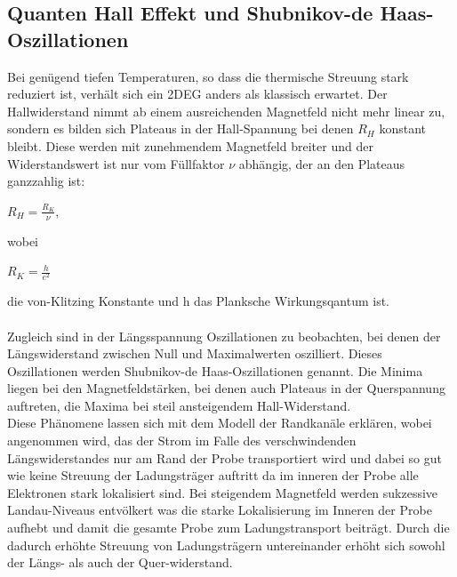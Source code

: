 \documentclass[10pt,a4paper]{article}
\begin{document}
\subsection*{Quanten Hall Effekt und Shubnikov-de Haas-Oszillationen}
Bei genügend tiefen Temperaturen, so dass die thermische Streuung stark reduziert ist, verhält sich ein 2DEG anders als klassisch erwartet. Der Hallwiderstand nimmt ab einem ausreichenden Magnetfeld nicht mehr linear zu, sondern es bilden sich Plateaus in der Hall-Spannung bei denen $ R_H $ konstant bleibt. Diese werden mit zunehmendem Magnetfeld breiter und der Widerstandswert ist nur vom Füllfaktor $ \nu $ abhängig, der an den Plateaus ganzzahlig ist: 
\begin{center}
 $ R_H =\frac{R_K}{\nu}$,
 \end{center} 
 wobei
 \begin{center}
  $R_K=\frac{h}{e^2} $
\end{center} 
die von-Klitzing Konstante und h das Planksche Wirkungsqantum ist.\\ \\
Zugleich sind in der Längsspannung Oszillationen zu beobachten, bei denen der Längswiderstand zwischen Null und Maximalwerten oszilliert. Dieses Oszillationen werden  Shubnikov-de Haas-Oszillationen genannt. Die Minima liegen bei den Magnetfeldstärken, bei denen auch Plateaus in der Querspannung auftreten, die Maxima bei steil ansteigendem Hall-Widerstand.\\
Diese Phänomene lassen sich mit dem Modell der Randkanäle erklären, wobei angenommen wird, das der Strom im Falle des verschwindenden Längswiderstandes nur am Rand der Probe transportiert wird und dabei so gut wie keine Streuung der Ladungsträger auftritt da im inneren der Probe alle Elektronen stark lokalisiert sind. Bei steigendem Magnetfeld werden sukzessive Landau-Niveaus entvölkert was die starke Lokalisierung im Inneren der Probe aufhebt und damit die gesamte Probe zum Ladungstransport beiträgt. Durch die dadurch erhöhte Streuung von Ladungsträgern untereinander erhöht sich sowohl der Längs- als auch der Quer-widerstand. 
\end{document}
